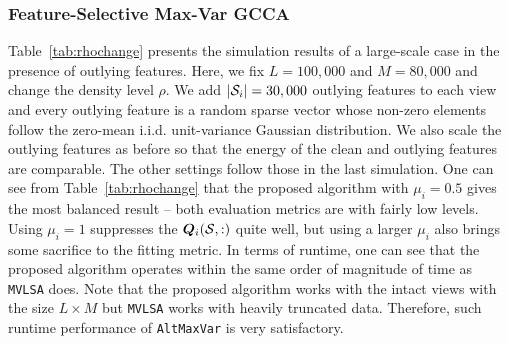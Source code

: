 \documentclass[10pt,journal]{IEEEtran}
\newcommand{\Q}{\boldsymbol{Q}}
\begin{document}
\begin{table}[htbp]
  \centering
   \caption{Cost values of the algorithms under different problem sizes. $L=M/0.8$, $\rho= 10^{-3}$, $\sigma=0.1$. $\dag$ means ``out of memory''.}
  \label{tab:cost_large_plain}%
\end{table}%



\subsubsection{Feature-Selective Max-Var GCCA}
Table~\ref{tab:rhochange} presents the simulation results of a large-scale case
in the presence of outlying features.
Here, we fix $L=100,000$ and $M=80,000$ and change the density level $\rho$.
We add $|{\cal S}_i|=30,000$ outlying features to each view and every outlying feature is a random sparse vector whose non-zero elements follow the zero-mean i.i.d. unit-variance Gaussian distribution.
We also scale the outlying features as before so that the energy of the clean and outlying features are comparable.
The other settings follow those in the last simulation.
One can see from Table~\ref{tab:rhochange} that the proposed algorithm with $\mu_i=0.5$
gives the most balanced result -- both evaluation metrics are with fairly low levels.
Using $\mu_i=1$ suppresses the $\Q_i({\cal S},:)$ quite well, but using a larger $\mu_i$ also brings some sacrifice to the fitting metric.
In terms of runtime, one can see that the proposed algorithm operates within the same order of magnitude of time as \texttt{MVLSA} does.
Note that the proposed algorithm works with the intact views with the size $L\times M$ but \texttt{MVLSA} works with heavily truncated data.
Therefore, such runtime performance of \texttt{AltMaxVar} is very satisfactory.
\end{document}
